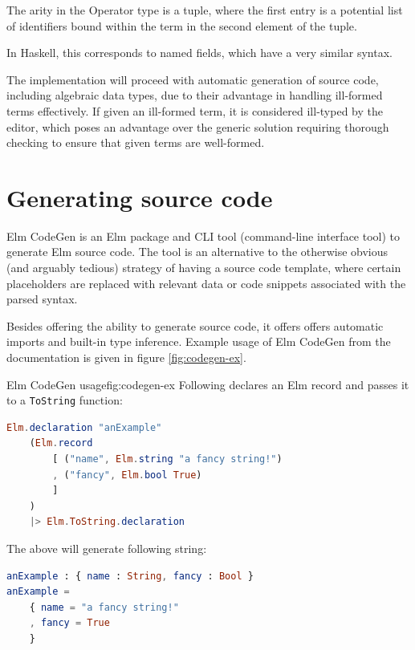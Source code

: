 \documentclass{article}
\begin{document}
The arity in the Operator type is a tuple, where the first entry is a potential list of identifiers bound within the term in the second element of the tuple.  

In Haskell, this corresponds to named fields\cite{haskell-records-named-fields}, which have a very similar syntax.

The implementation will proceed with automatic generation of source code, including algebraic data types, due to their advantage in handling ill-formed terms effectively. If given an ill-formed term, it is considered ill-typed by the editor, which poses an advantage over the generic solution requiring thorough checking to ensure that given terms are well-formed.

\section{Generating source code}
Elm CodeGen\cite{elm-codegen-package} is an Elm package and CLI tool (command-line interface tool) to generate Elm source code. The tool is an alternative to the otherwise obvious (and arguably tedious) strategy of having a source code template, where certain placeholders are replaced with relevant data or code snippets associated with the parsed syntax.

Besides offering the ability to generate source code, it offers offers automatic imports and built-in type inference. Example usage of Elm CodeGen from the documentation\cite{elm-codegen-package} is given in figure \ref{fig:codegen-ex}.

\begin{myfigure}{Elm CodeGen usage}{fig:codegen-ex}
Following declares an Elm record and passes it to a \texttt{ToString} function: 

\begin{lstlisting}[backgroundcolor=\color{myfigurecolorback},language=elm]
Elm.declaration "anExample"
    (Elm.record
        [ ("name", Elm.string "a fancy string!")
        , ("fancy", Elm.bool True)
        ]
    )
    |> Elm.ToString.declaration
\end{lstlisting}

The above will generate following string:
\begin{lstlisting}[backgroundcolor=\color{myfigurecolorback},language=elm]
anExample : { name : String, fancy : Bool }
anExample =
    { name = "a fancy string!"
    , fancy = True
    }
\end{lstlisting}
\end{myfigure}
\end{document}
